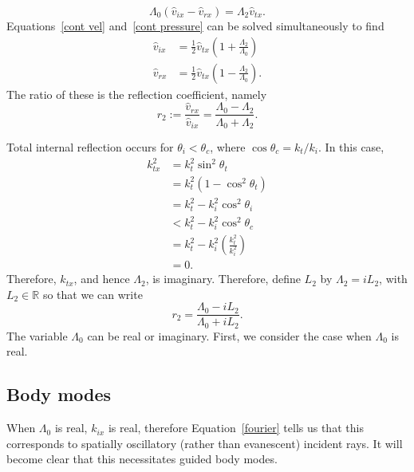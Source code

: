 	\begin{equation}
	\Lambda_0(\hat{v}_{ix} - \hat{v}_{rx}) = \Lambda_2 \hat{v}_{tx}. \label{cont pressure}
	\end{equation}
	Equations~\eqref{cont vel} and~\eqref{cont pressure} can be solved simultaneously to find
	\begin{align}
	\hat{v}_{ix} &= \frac{1}{2}\hat{v}_{tx}\left(1 + \frac{\Lambda_2}{\Lambda_0}\right) \\
	\hat{v}_{rx} &= \frac{1}{2}\hat{v}_{tx}\left(1 - \frac{\Lambda_2}{\Lambda_0}\right).
	\end{align}
	The ratio of these is the reflection coefficient, namely
	\begin{equation}
	r_2 := \frac{\hat{v}_{rx}}{\hat{v}_{ix}} = \frac{\Lambda_0 - \Lambda_2}{\Lambda_0 + \Lambda_2}. \label{reflection coefficient}
	\end{equation}
	
	Total internal reflection occurs for $\theta_i < \theta_c$, where $\cos{\theta_c} = k_t / k_i$. In this case,
	\begin{align}
	k_{tx}^2 &= k_t^2 \sin^2{\theta_t} \\
	&= k_t^2(1 - \cos^2{\theta_t}) \\
	&= k_t^2 - k_i^2\cos^2{\theta_i} \\
	&< k_t^2 - k_i^2\cos^2{\theta_c} \\
	&= k_t^2 - k_i^2 \left(\frac{k_t^2}{k_i^2}\right) \\
	&= 0.
	\end{align}
	Therefore, $k_{tx}$, and hence $\Lambda_2$, is imaginary. Therefore, define $L_2$ by $\Lambda_2 = i L_2$, with $L_2 \in \mathbb{R}$ so that we can write
	\begin{equation}
	r_2 = \frac{\Lambda_0 - iL_2}{\Lambda_0 + iL_2}. \label{reflection coefficient 2}
	\end{equation}
	The variable $\Lambda_0$ can be real or imaginary. First, we consider the case when $\Lambda_0$ is real.
	
	
	\subsection{Body modes}
	When $\Lambda_0$ is real, $k_{ix}$ is real, therefore Equation~\eqref{fourier} tells us that this corresponds to spatially oscillatory (rather than evanescent) incident rays. It will become clear that this necessitates guided body modes.
	
